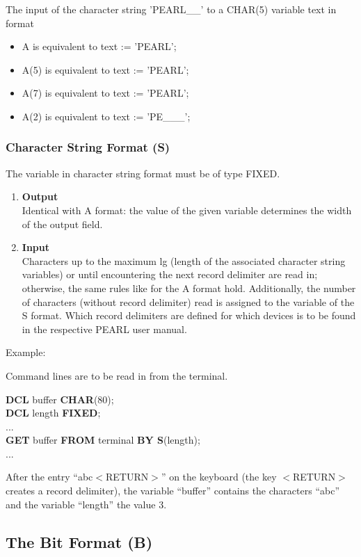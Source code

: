 The input of the character string 'PEARL\_\_' to a CHAR(5) variable text in
format

\begin{itemize}
\item A is equivalent to text := 'PEARL';
\item A(5) is equivalent to text := 'PEARL';
\item A(7) is equivalent to text := 'PEARL';
\item A(2) is equivalent to text := 'PE\_\_\_';
\end{itemize}

\subsubsection{Character String Format (S)}

The variable in character string format must be of type FIXED.
\begin{enumerate}
\item {\bf Output}\\
Identical with A format: the value of the given variable determines the
width of the output field.
\item{\bf Input}\\
Characters up to the maximum lg (length of the associated character
string variables) or until encountering the next record delimiter are
read in; otherwise, the same rules like for the A format hold.
Additionally, the number of characters (without record delimiter) read
is assigned to the variable of the S format. Which record delimiters are
defined for which devices is to be found in the respective PEARL user
manual.
\end{enumerate}

Example:

Command lines are to be read in from the terminal.

{\bf DCL} buffer {\bf CHAR}(80);\\
{\bf DCL} length {\bf FIXED};\\
...\\
{\bf GET} buffer {\bf FROM} terminal {\bf BY S}(length);\\
...

After the entry ``abc$<$RETURN$>$'' on the keyboard (the key
$<$RETURN$>$ creates a record delimiter), the variable ``buffer''
contains the characters ``abc'' and the variable ``length'' the value 3.

\subsection{The Bit Format (B)}    %
\label{sec_dation_b_format}

